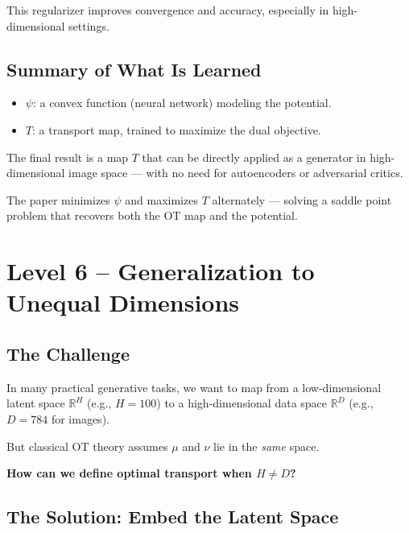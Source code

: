 \documentclass[11pt]{article}
\begin{document}
This regularizer improves convergence and accuracy, especially in high-dimensional settings.

\subsection*{Summary of What Is Learned}
\begin{itemize}
  \item $\psi$: a convex function (neural network) modeling the potential.
  \item $T$: a transport map, trained to maximize the dual objective.
\end{itemize}

The final result is a map $T$ that can be directly applied as a generator in high-dimensional image space — with no need for autoencoders or adversarial critics.

\begin{tcolorbox}[colback=blue!2!white, colframe=blue!80!black, title=In Practice]
The paper minimizes $\psi$ and maximizes $T$ alternately — solving a saddle point problem that recovers both the OT map and the potential.
\end{tcolorbox}


\newpage
{}
\section*{Level 6 – Generalization to Unequal Dimensions}

\subsection*{The Challenge}

In many practical generative tasks, we want to map from a low-dimensional latent space $\mathbb{R}^H$ (e.g., $H = 100$) to a high-dimensional data space $\mathbb{R}^D$ (e.g., $D = 784$ for images). 

But classical OT theory assumes $\mu$ and $\nu$ lie in the \emph{same} space.

\begin{highlight}
\textbf{How can we define optimal transport when $H \neq D$?}
\end{highlight}

\subsection*{The Solution: Embed the Latent Space}
\end{document}
